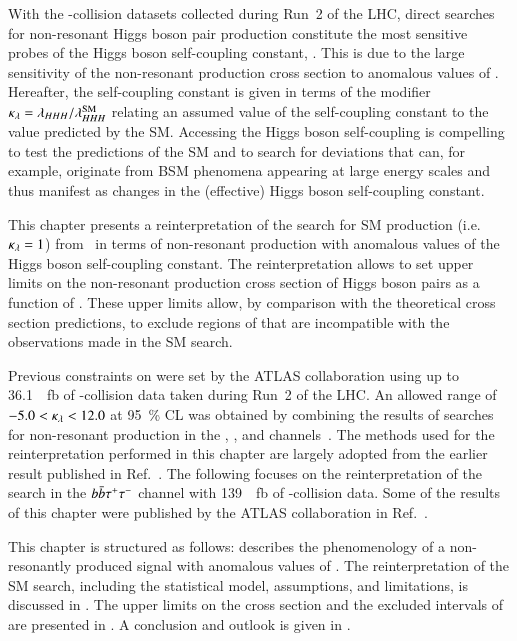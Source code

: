 With the \pp-collision datasets collected during Run~2 of the LHC,
direct searches for non-resonant Higgs boson pair production
constitute the most sensitive probes of the Higgs boson self-coupling
constant, \lambdahhh. This is due to the large sensitivity of the
non-resonant \HH production cross section to anomalous values of
\lambdahhh. Hereafter, the self-coupling constant is given in terms of
the modifier $\kappa_{\lambda} = \lambda_{HHH} / \lambda_{HHH}^{\text{SM}}$ relating
an assumed value of the self-coupling constant to the value predicted
by the SM. Accessing the Higgs boson self-coupling is compelling to
test the predictions of the SM and to search for deviations that can,
for example, originate from BSM phenomena appearing at large energy
scales and thus manifest as changes in the (effective) Higgs boson
self-coupling constant.

This chapter presents a reinterpretation of the search for SM \HH
production (i.e.\ $\kappa_{\lambda} = 1$) from~ in terms of
non-resonant \HH production with anomalous values of the Higgs boson
self-coupling constant. The reinterpretation allows to set upper
limits on the non-resonant production cross section of Higgs boson
pairs as a function of \klambda. These upper limits allow, by
comparison with the theoretical cross section predictions, to exclude
regions of \klambda that are incompatible with the observations made
in the SM \HH search.

Previous constraints on \klambda were set by the ATLAS collaboration
using up to \SI{36.1}{\per\femto\barn} of \pp-collision data taken
during Run~2 of the LHC. An allowed range of $-5.0 < \kappa_{\lambda} < 12.0$
at \SI{95}{\percent} CL was obtained by combining the results of
searches for non-resonant \HH production in the \bbtautau, \bbbb, and
\bbyy channels~\cite{HDBS-2018-58}. The methods used for the
reinterpretation performed in this chapter are largely adopted from
the earlier result published in Ref.~\cite{HDBS-2018-58}. The
following focuses on the reinterpretation of the search in the
$b\bar{b}\tau^{+} \tau^{-}$ channel with \SI{139}{\per\femto\barn} of
\pp-collision data. Some of the results of this chapter were published
by the ATLAS collaboration in Ref.~\cite{ATLAS-CONF-2021-052}.

This chapter is structured as follows: 
describes the phenomenology of a non-resonantly produced \HH signal
with anomalous values of \klambda. The reinterpretation of the SM \HH
search, including the statistical model, assumptions, and limitations,
is discussed in . The upper limits on the
cross section and the excluded intervals of \klambda are presented in
. A conclusion and outlook is given
in .


